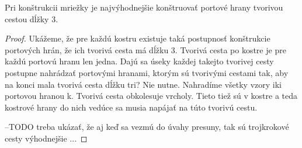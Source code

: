 \begin{lem}
Pri konštrukcii mriežky je najvýhodnejšie konštruovať portové hrany tvorivou
cestou dĺžky 3.
\end{lem}
\begin{proof}
Ukážeme, že pre každú kostru existuje taká postupnosť konštrukcie portových
hrán, že ich tvorivá cesta má dĺžku 3. Tvorivá cesta po kostre je pre každú
portovú hranu len jedna. Dajú sa úseky každej takejto tvorivej cesty
postupne nahrádzať portovými hranami, ktorým sú tvorivými cestami tak, aby
na konci mala tvorivá cesta dĺžku tri?
Nie nutne.
Nahradíme všetky vzory iki portovou hranou k.
Tvorivá cesta obkolesuje vrcholy. Tieto tiež sú v kostre a teda kostrové
hrany do nich vedúce sa musia napájať na túto tvorivú cestu.

--TODO
treba ukázať, že aj keď sa vezmú do úvahy presuny, tak sú trojkrokové cesty
výhodnejšie ...
\end{proof}

